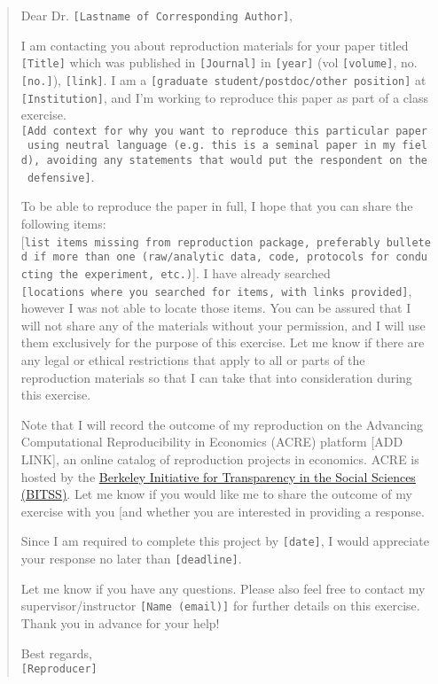 \documentclass[]{book}
\begin{document}
\begin{quote}
Dear Dr. \texttt{{[}Lastname\ of\ Corresponding\ Author{]}},

I am contacting you about reproduction materials for your paper titled \texttt{{[}Title{]}} which was published in \texttt{{[}Journal{]}} in \texttt{{[}year{]}} (vol \texttt{{[}volume{]}}, no. \texttt{{[}no.{]}}), \texttt{{[}link{]}}.
I am a \texttt{{[}graduate\ student/postdoc/other\ position{]}} at \texttt{{[}Institution{]}}, and I'm working to reproduce this paper as part of a class exercise. \texttt{{[}Add\ context\ for\ why\ you\ want\ to\ reproduce\ this\ particular\ paper\ using\ neutral\ language\ (e.g.\ this\ is\ a\ seminal\ paper\ in\ my\ field),\ avoiding\ any\ statements\ that\ would\ put\ the\ respondent\ on\ the\ defensive{]}}.

To be able to reproduce the paper in full, I hope that you can share the following items: {[}\texttt{list\ items\ missing\ from\ reproduction\ package,\ preferably\ bulleted\ if\ more\ than\ one\ (raw/analytic\ data,\ code,\ protocols\ for\ conducting\ the\ experiment,\ etc.)}{]}. I have already searched \texttt{{[}locations\ where\ you\ searched\ for\ items,\ with\ links\ provided{]}}, however I was not able to locate those items. You can be assured that I will not share any of the materials without your permission, and I will use them exclusively for the purpose of this exercise. Let me know if there are any legal or ethical restrictions that apply to all or parts of the reproduction materials so that I can take that into consideration during this exercise.

Note that I will record the outcome of my reproduction on the Advancing Computational Reproducibility in Economics (ACRE) platform {[}ADD LINK{]}, an online catalog of reproduction projects in economics. ACRE is hosted by the \href{https://www.bitss.org/}{Berkeley Initiative for Transparency in the Social Sciences (BITSS)}. Let me know if you would like me to share the outcome of my exercise with you {[}and whether you are interested in providing a response.

Since I am required to complete this project by \texttt{{[}date{]}}, I would appreciate your response no later than \texttt{{[}deadline{]}}.

Let me know if you have any questions. Please also feel free to contact my supervisor/instructor \texttt{{[}Name\ (email){]}} for further details on this exercise. Thank you in advance for your help!

Best regards,\\
\texttt{{[}Reproducer{]}}
\end{quote}
\end{document}

